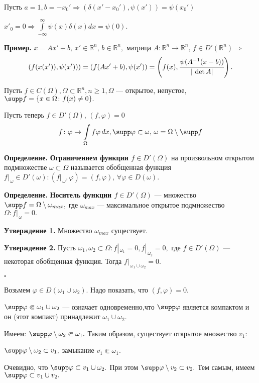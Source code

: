 \documentclass[unicode,12pt,draft]{article}
\begin{document}
Пусть $a=1, b=-x_0' \Rightarrow
(\delta(x'-x_0'),\psi(x'))=\psi(x_0')$

$x'_0=0 \Rightarrow
\int\limits_{-\infty}^{\infty}\psi(x)\delta(x)dx=\psi(0).$

\textbf{Пример.} $x=Ax'+b,\,x'\in \mathbb R^n, \,b\in\mathbb R^n,
$ матрица $A\colon \mathbb R^n\to\mathbb R^n, \,f\in D'(\mathbb
R^n) \Rightarrow $
$$(f(x(x')),\psi(x')))=(f(Ax'+b),\psi(x'))=\left(f(x),\cfrac{\psi(A^{-1}(x-b))}{|\,\det
A|}\right).$$


Пусть $f\in C(\Omega), \Omega\subset \mathbb R^n, n\ge1, \Omega$
--- открытое, непустое, $\supp f=\{x\in \Omega\colon f(x)\ne0\}.$

Пусть теперь $f\in D'(\Omega)$, $(f,\varphi)=0$
$$f\colon \varphi\to\int\limits_{\Omega}f\varphi\,dx, \supp \varphi\subset \omega,\, \omega=\Omega \setminus \supp f$$

\textbf{Определение.} \textbf{Ограничением функции $f\in D'
(\Omega)$} на произвольном открытом подмножестве
$\omega\subset\Omega$ называется обобщенная функция
$f|_{\,\omega}\in D' (\omega)\colon
(f|_{\,\omega},\varphi)=(f,\varphi), \,\forall \varphi \in D
(\omega).$

\textbf{Определение.} \textbf{Носитель функции $f\in D' (\Omega)$}
--- множество $\supp f=\Omega \setminus \omega_{max},$ где
$\omega_{max}$ --- максимальное открытое подмножество
$\Omega\colon f|_{\,\omega}=0.$

\textbf{Утверждение 1.} Множество $\omega_{max}$ существует.

\textbf{Утверждение 2.} Пусть $\omega_1, \omega_2\subset
\Omega\colon f|_{\,\omega_1}=0, f|_{\,\omega_2}=0,$ где $f\in
D'(\Omega)$ --- некоторая обобщенная функция. Тогда
$f|_{\,\omega_1\cup\omega_2}=0.$

$\square$

Возьмем $\varphi\in D(\omega_1\cup\omega_2).$ Надо показать, что
$(f,\varphi)=0.$

$\supp \varphi\Subset \omega_1\cup\omega_2$ --- означает
одновременно,что $\supp \varphi$ является компактом и он (этот
компакт) принадлежит $\omega_1\cup\omega_2.$

Имеем: $\supp \varphi \setminus \omega_2 \Subset \omega_1.$ Таким
образом, существует открытое множество $v_1:$

$\supp \varphi \setminus \omega_2 \subset v_1,$ замыкание
$\overline {v_1}\Subset \omega_1.$

Очевидно, что $\supp \varphi \subset v_1\cup\omega_2.$ При этом
$\supp \varphi \setminus v_2\subset v_2.$ Тем самым, имеем $\supp
\varphi\subset v_1\cup v_2.$
\end{document}
